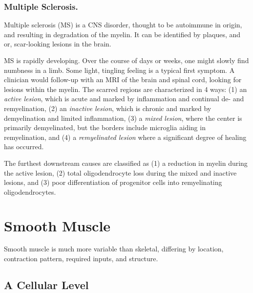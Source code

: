 \documentclass[12pt]{report}
\begin{document}
\subsubsection{Multiple Sclerosis.}

\label{sec:MSdigression}

Multiple sclerosis (MS) is a CNS disorder, thought to be autoimmune in origin, and resulting in degradation of the myelin. It can be identified by plaques, and or, scar-looking lesions in the brain.\newline

MS is rapidly developing. Over the course of days or weeks, one might slowly find numbness in a limb. Some light, tingling feeling is a typical first symptom. A clinician would follow-up with an MRI of the brain and spinal cord, looking for lesions within the myelin. The scarred regions are characterized in 4 ways: (1) an \textit{active lesion}, which is acute and marked by inflammation and continual de- and remyelination, (2) an \textit{inactive lesion}, which is chronic and marked by demyelination and limited inflammation, (3) a \textit{mixed lesion}, where the center is primarily demyelinated, but the borders include microglia aiding in remyelination, and (4) a \textit{remyelinated lesion} where a significant degree of healing has occurred.\newline

The furthest downstream causes are classified as (1) a reduction in myelin during the active lesion, (2) total oligodendrocyte loss during the mixed and inactive lesions, and (3) poor differentiation of progenitor cells into remyelinating oligodendrocytes. 



\section{Smooth Muscle}

Smooth muscle is much more variable than skeletal, differing by location, contraction pattern, required inputs, and structure. 


\subsection{A Cellular Level}
\end{document}
